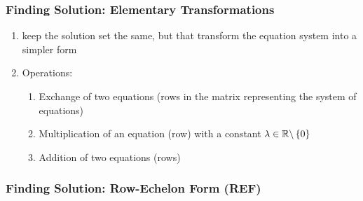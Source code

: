 \subsubsection{Finding Solution: Elementary Transformations}

\begin{enumerate}[itemsep=0.2cm]
    \item keep the solution set the same, but that transform the equation system into a simpler form
    \hfill \cite{mfml/book/mml/Deisenroth-Faisal-Ong}

    \item Operations:
    \begin{enumerate}
        \item Exchange of two equations (rows in the matrix representing the system of equations)
        \hfill \cite{mfml/book/mml/Deisenroth-Faisal-Ong}

        \item Multiplication of an equation (row) with a constant $\lambda \in \mathbb{R} \backslash \left\{0\right\}$
        \hfill \cite{mfml/book/mml/Deisenroth-Faisal-Ong}

        \item Addition of two equations (rows) 
        \hfill \cite{mfml/book/mml/Deisenroth-Faisal-Ong}
    \end{enumerate}
\end{enumerate}










\subsubsection{Finding Solution: Row-Echelon Form (REF)}

